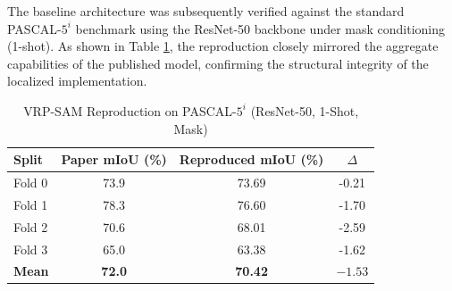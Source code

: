 \documentclass[journal,12pt,onecolumn,draftclsnofoot]{IEEEtran}
\begin{document}
\begin{table}[htbp]
\centering
\caption{VRP-SAM Experiments Reproduction on COCO Dataset (mIoU \%)}
\label{tab:vrp_sam_reprod}
\end{table}

The baseline architecture was subsequently verified against the standard PASCAL-$5^i$ benchmark using the ResNet-50 backbone under mask conditioning (1-shot). As shown in Table \ref{tab:vrp_sam_pascal}, the reproduction closely mirrored the aggregate capabilities of the published model, confirming the structural integrity of the localized implementation.

\begin{table}[htbp]
\centering
\caption{VRP-SAM Reproduction on PASCAL-$5^i$ (ResNet-50, 1-Shot, Mask)}
\label{tab:vrp_sam_pascal}
\begin{tabular}{l c c c}
\toprule
\textbf{Split} & \textbf{Paper mIoU (\%)} & \textbf{Reproduced mIoU (\%)} & \textbf{$\Delta$} \\
\midrule
Fold 0 & 73.9 & 73.69 & -0.21 \\
Fold 1 & 78.3 & 76.60 & -1.70 \\
Fold 2 & 70.6 & 68.01 & -2.59 \\
Fold 3 & 65.0 & 63.38 & -1.62 \\
\midrule
\textbf{Mean} & \textbf{72.0} & \textbf{70.42} & \textbf{$-1.53$} \\
\bottomrule
\end{tabular}
\end{table}
\end{document}
